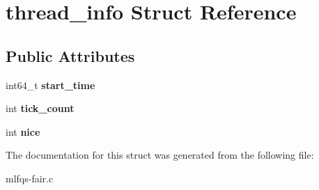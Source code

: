 \hypertarget{structthread__info}{}\section{thread\+\_\+info Struct Reference}
\label{structthread__info}
\subsection*{Public Attributes}
\begin{DoxyCompactItemize}
\item 
int64\+\_\+t {\bfseries start\+\_\+time}\hypertarget{structthread__info_af4961cb76be9b33c3a8488fad686b756}{}\label{structthread__info_af4961cb76be9b33c3a8488fad686b756}

\item 
int {\bfseries tick\+\_\+count}\hypertarget{structthread__info_abada07c0594b60d52c280c644e25348b}{}\label{structthread__info_abada07c0594b60d52c280c644e25348b}

\item 
int {\bfseries nice}\hypertarget{structthread__info_aa20c50d121d863b1b7fac6002653b6ec}{}\label{structthread__info_aa20c50d121d863b1b7fac6002653b6ec}

\end{DoxyCompactItemize}


The documentation for this struct was generated from the following file\+:\begin{DoxyCompactItemize}
\item 
mlfqs-\/fair.\+c\end{DoxyCompactItemize}
